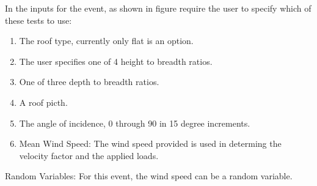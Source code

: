In the inputs for the event, as shown in figure  require the user to specify which 
of these tests to use:
\begin{enumerate} 
\item The roof type, currently only flat is an option.
\item The user specifies one of 4 height to breadth ratios.
\item One of three depth to breadth ratios.
\item A roof picth.
\item The angle of incidence, 0 through 90 in 15 degree increments.
\item Mean Wind Speed: The wind speed provided is used in determing the velocity factor and the applied loads. 
\end{enumerate}

Random Variables: For this event, the wind speed can be a random variable.

